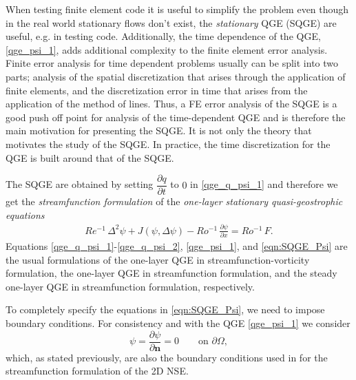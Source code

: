 When testing finite element code it is useful to simplify the problem even
though in the real world stationary flows don't exist, the \emph{stationary} QGE
(SQGE) are useful, e.g. in testing code.  Additionally, the time dependence of
the QGE, \eqref{qge_psi_1}, adds additional complexity to the finite element
error analysis. Finite error analysis for time dependent problems usually can be
split into two parts; analysis of the spatial discretization that arises through
the application of finite elements, and the discretization error in time that
arises from the application of the method of lines. Thus, a FE error analysis of
the SQGE is a good push off point for analysis of the time-dependent QGE and is
therefore the main motivation for presenting the SQGE.  It is not only the
theory that motivates the study of the SQGE. In practice, the time
discretization for the QGE is built around that of the SQGE.

The SQGE are obtained by setting $\dfrac{\partial q}{\partial t}$ to $0$ in
\eqref{qge_q_psi_1} and therefore we get the \emph{streamfunction formulation}
of the \emph{one-layer stationary quasi-geostrophic equations}
\begin{eqnarray}
  Re^{-1} \, \Delta^2 \psi + J(\psi , \Delta \psi) - Ro^{-1} \, \frac{\partial
    \psi}{\partial x} = Ro^{-1} \, F .
  \label{eqn:SQGE_Psi}
\end{eqnarray}
Equations \eqref{qge_q_psi_1}-\eqref{qge_q_psi_2}, \eqref{qge_psi_1}, and
\eqref{eqn:SQGE_Psi} are the usual formulations of the one-layer QGE in
streamfunction-vorticity formulation, the one-layer QGE in streamfunction
formulation, and the steady one-layer QGE in streamfunction formulation,
respectively.

To completely specify the equations in \eqref{eqn:SQGE_Psi}, we need to impose
boundary conditions. For consistency and with the QGE \eqref{qge_psi_1}  we
consider
\begin{equation*}
  \psi = \frac{\partial \psi}{\partial \mathbf{n}} = 0 \qquad \text{on } \partial \Omega,
\end{equation*}
which, as stated previously, are also the boundary conditions used in
\cite{Gunzburger89} for the streamfunction formulation of the 2D NSE.

